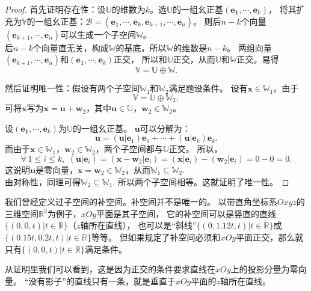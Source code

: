 \documentclass[12pt,UTF8,fontset=none]{ctexbook}
\begin{document}
\begin{proof} %
    首先证明存在性：设$\mathbb{U}$的维数为$k$。选$\mathbb{U}$的一组幺正基$(\mathbf{e_1}, \cdots, \mathbf{e}_k)$，
    将其扩充为$\mathbb{V}$的一组幺正基：$\mathcal{B} = (\mathbf{e_1}, \cdots, \mathbf{e}_k, \mathbf{e}_{k+1}, \cdots , \mathbf{e}_n)$。
    则后$n-k$个向量$(\mathbf{e}_{k+1}, \cdots , \mathbf{e}_n)$可以生成一个子空间$\mathbb{W}$。\\
    后$n-k$个向量直无关，构成$\mathbb{W}$的基底，所以$\mathbb{W}$的维数是$n-k$。
    两组向量$(\mathbf{e}_{k+1}, \cdots , \mathbf{e}_n)$和$(\mathbf{e_1}, \cdots, \mathbf{e}_k)$正交，
    所以和$\mathbb{U}$正交，从而$\mathbb{U}$和$\mathbb{W}$正交。易得
    $$ \mathbb{V} = \mathbb{U} \oplus \mathbb{W}.$$

    然后证明唯一性：假设有两个子空间$\mathbb{W}_1$和$\mathbb{W}_2$满足题设条件。
    设有$\mathbf{x} \in \mathbb{W}_1$。由于
    $$ \mathbb{V} = \mathbb{U} \oplus \mathbb{W}_2,$$
    可将$\mathbf{x}$写为$\mathbf{x} = \mathbf{u} + \mathbf{w}_2$，其中$\mathbf{u} \in \mathbb{U}$，$\mathbf{w}_2 \in \mathbb{W}_2$。

    设$(\mathbf{e_1}, \cdots, \mathbf{e}_k)$为$\mathbb{U}$的一组幺正基。
    $\mathbf{u}$可以分解为：
    $$ \mathbf{u} = (\mathbf{u}|\mathbf{e}_1)\mathbf{e}_1 + \cdots + (\mathbf{u}|\mathbf{e}_k)\mathbf{e}_k.$$
    而由于$\mathbf{x} \in\mathbb{W}_1$，$\mathbf{w}_2 \in\mathbb{W}_2$，两个子空间都与$\mathbb{U}$正交。
    所以，
    $$ \forall \, 1 \leqslant i \leqslant k, \,\, (\mathbf{u}|\mathbf{e}_i) = (\mathbf{x} - \mathbf{w}_2|\mathbf{e}_i) = (\mathbf{x}|\mathbf{e}_i) - (\mathbf{w}_2|\mathbf{e}_i) = 0 - 0 = 0.$$
    这说明$\mathbf{u}$是零向量，$\mathbf{x} = \mathbf{w}_2 \in \mathbb{W}_2$，从而$\mathbb{W}_1 \subseteq \mathbb{W}_2$.\\
    由对称性，同理可得$\mathbb{W}_2 \subseteq \mathbb{W}_1$. 所以两个子空间相等。这就证明了唯一性。

\end{proof}


我们曾经定义过子空间的补空间。补空间并不是唯一的。
以带直角坐标系$Oxyz$的三维空间$\mathbb{R}^3$为例子，$xOy$平面是其子空间，
它的补空间可以是竖直的直线$\{(0,0,t) | t \in \mathbb{R}\}$（$z$轴所在直线），
也可以是“斜线”$\{(0,1.12t,t) | t \in \mathbb{R}\}$或$\{(0.15t,0.2t,t) | t \in \mathbb{R}\}$等等。
但如果规定了补空间必须和$xOy$平面正交，那么就只有$\{(0,0,t) | t \in \mathbb{R}\}$满足条件。

从证明里我们可以看到，这是因为正交的条件要求直线在$xOy$上的投影分量为零向量。
“没有影子”的直线只有一条，就是垂直于$xOy$平面的$z$轴所在直线。
\end{document}
